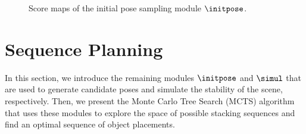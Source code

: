 \begin{figure}[t]
  \centering
  \caption{Score maps of the initial pose sampling module $\initpose$.}
  \label{fig:score_map}
\end{figure}


\section{Sequence Planning} \label{sec:sequence_planning}

In this section, we introduce the remaining modules $\initpose$ and $\simul$ that are used to generate candidate poses and simulate the stability of the scene, respectively.
Then, we present the Monte Carlo Tree Search (MCTS) algorithm that uses these modules to explore the space of possible stacking sequences and find an optimal sequence of object placements.

